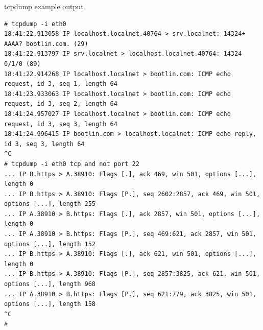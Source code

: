 \begin{frame}[fragile]{tcpdump example output}
    \begin{block}{}
      \begin{verbatim}
# tcpdump -i eth0
18:41:22.913058 IP localhost.localnet.40764 > srv.localnet: 14324+ AAAA? bootlin.com. (29)
18:41:22.913797 IP srv.localnet > localhost.localnet.40764: 14324 0/1/0 (89)
18:41:22.914268 IP localhost.localnet > bootlin.com: ICMP echo request, id 3, seq 1, length 64
18:41:23.933063 IP localhost.localnet > bootlin.com: ICMP echo request, id 3, seq 2, length 64
18:41:24.957027 IP localhost.localnet > bootlin.com: ICMP echo request, id 3, seq 3, length 64
18:41:24.996415 IP bootlin.com > localhost.localnet: ICMP echo reply, id 3, seq 3, length 64
^C
# tcpdump -i eth0 tcp and not port 22
... IP B.https > A.38910: Flags [.], ack 469, win 501, options [...], length 0
... IP B.https > A.38910: Flags [P.], seq 2602:2857, ack 469, win 501, options [...], length 255
... IP A.38910 > B.https: Flags [.], ack 2857, win 501, options [...], length 0
... IP A.38910 > B.https: Flags [P.], seq 469:621, ack 2857, win 501, options [...], length 152
... IP B.https > A.38910: Flags [.], ack 621, win 501, options [...], length 0
... IP B.https > A.38910: Flags [P.], seq 2857:3825, ack 621, win 501, options [...], length 968
... IP A.38910 > B.https: Flags [P.], seq 621:779, ack 3825, win 501, options [...], length 158
^C
#
      \end{verbatim}
    \end{block}
\end{frame}

